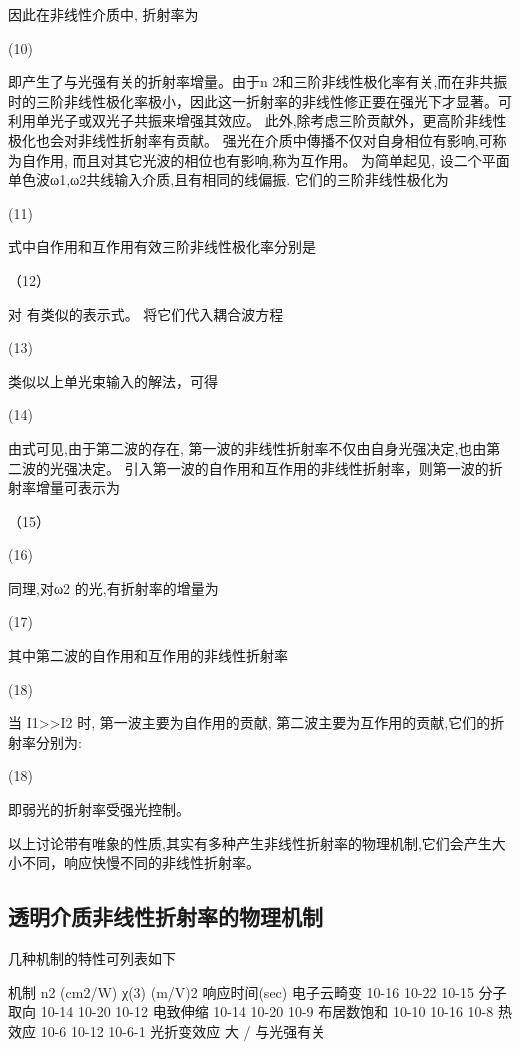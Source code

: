 因此在非线性介质中, 折射率为

                                                          (10)

即产生了与光强有关的折射率增量。由于n 2和三阶非线性极化率有关,而在非共振时的三阶非线性极化率极小，因此这一折射率的非线性修正要在强光下才显著。可利用单光子或双光子共振来增强其效应。 此外,除考虑三阶贡献外，更高阶非线性极化也会对非线性折射率有贡献。
强光在介质中傳播不仅对自身相位有影响,可称为自作用, 而且对其它光波的相位也有影响,称为互作用。 为简单起见, 设二个平面单色波ω1,ω2共线输入介质,且有相同的线偏振.  它们的三阶非线性极化为

               (11)

式中自作用和互作用有效三阶非线性极化率分别是

                                     （12）

对 有类似的表示式。 将它们代入耦合波方程

                      (13)

类似以上单光束输入的解法，可得

                  (14)

由式可见,由于第二波的存在, 第一波的非线性折射率不仅由自身光强决定,也由第二波的光强决定。 引入第一波的自作用和互作用的非线性折射率，则第一波的折射率增量可表示为

                               （15） 

                     (16)

同理,对ω2 的光,有折射率的增量为

                             (17)

其中第二波的自作用和互作用的非线性折射率

                   (18)

当 I1>>I2 时, 第一波主要为自作用的贡献, 第二波主要为互作用的贡献,它们的折射率分别为: 

                                   (18)

即弱光的折射率受强光控制。

以上讨论带有唯象的性质,其实有多种产生非线性折射率的物理机制,它们会产生大小不同，响应快慢不同的非线性折射率。     

\subsection{透明介质非线性折射率的物理机制}
    
几种机制的特性可列表如下

机制	n2 (cm2/W)	χ(3) (m/V)2	响应时间(sec)
电子云畸变	10-16	10-22	10-15
分子取向	10-14	10-20	10-12
电致伸缩	10-14	10-20	10-9
布居数饱和	10-10	10-16	10-8
热效应	10-6	10-12	10-6-1
光折变效应	大	/	与光强有关

